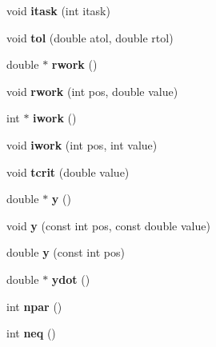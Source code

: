 \begin{DoxyCompactItemize}
void {\bfseries itask} (int itask)
\item 
\mbox{\label{classodepack__dlsoda_a962ee79439a59f4cb41d94e95b7ba525}} 
void {\bfseries tol} (double atol, double rtol)
\item 
\mbox{\label{classodepack__dlsoda_a3b403151021e2e5766742f88c779ccf5}} 
double $\ast$ {\bfseries rwork} ()
\item 
\mbox{\label{classodepack__dlsoda_a0a5f8ba6ba0b8efd119189888eb29341}} 
void {\bfseries rwork} (int pos, double value)
\item 
\mbox{\label{classodepack__dlsoda_a3b6fda49f4eb659a842215d6edb8fb4e}} 
int $\ast$ {\bfseries iwork} ()
\item 
\mbox{\label{classodepack__dlsoda_a173262fcf6a7d91c2efbc422fdcbee3a}} 
void {\bfseries iwork} (int pos, int value)
\item 
\mbox{\label{classodepack__dlsoda_a809c83e3b27e0ad742f08c18c62b72e2}} 
void {\bfseries tcrit} (double value)
\item 
\mbox{\label{classodepack__dlsoda_ac213f89f6c310344d40d427a82712f01}} 
double $\ast$ {\bfseries y} ()
\item 
\mbox{\label{classodepack__dlsoda_a7605648b51623b14733c9958df90494a}} 
void {\bfseries y} (const int pos, const double value)
\item 
\mbox{\label{classodepack__dlsoda_afb0248bc488b07ac9fecbfd732b39e6e}} 
double {\bfseries y} (const int pos)
\item 
\mbox{\label{classodepack__dlsoda_ad6b4e99f2e1aa37e7b2ecd876c79b2cf}} 
double $\ast$ {\bfseries ydot} ()
\item 
\mbox{\label{classodepack__dlsoda_a7626e417b46f44762cd167d836f3c461}} 
int {\bfseries npar} ()
\item 
\mbox{\label{classodepack__dlsoda_a419a318700e6bac2163faac864c3e3d2}} 
int {\bfseries neq} ()
\end{DoxyCompactItemize}
